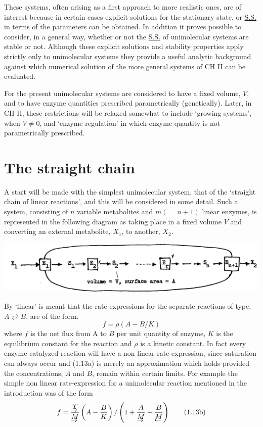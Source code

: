 These systems, often arising as a first approach to more realistic ones, are of interest because in certain cases explicit solutions for the stationary state, or \underline{S.S.} in terms of the parameters can be obtained. In addition it proves possible to consider, in a general way, whether or not the \underline{S.S.} of unimolecular systems are stable or not. Although these explicit solutions and stability properties apply strictly only to unimolecular systems they provide a useful analytic background against which numerical solution of the more general systems of CH II can be evaluated.

For the present unimolecular systems are considered to have a fixed volume, $V$, and to have enzyme quantities prescribed parametrically (genetically). Later, in CH II, these restrictions will be relaxed somewhat to include `growing systems', when $\dot{V} \neq 0$, and `enzyme regulation' in which enzyme quantity is not parametrically prescribed.

\section{The straight chain}

A start will be made with the simplest unimolecular system, that of the `straight chain of linear reactions', and this will be considered in some detail. Such a system, consisting of $n$ variable metabolites and $m(=n+1)$ linear enzymes, is represented in the following diagram as taking place in a fixed volume $V$ and converting an external metabolite, $X_1$, to another, $X_2$.

\begin{center}
\includegraphics[max width=\textwidth]{figure1_chain}
\end{center}

By `linear' is meant that the rate-expressions for the separate reactions of type, $A \rightleftarrows B$, are of the form.
%
\begin{equation}
f = \rho(A-B / K) \tag{1.13a}
\label{eqn:113a}
\end{equation}
%
where $f$ is the net flux from A to $B$ per unit quantity of enzyme, $K$ is the equilibrium constant for the reaction and $\rho$ is a kinetic constant. In fact every enzyme catalyzed reaction will have a non-linear rate expression, since saturation can always occur and (1.13a) is merely an approximation which holds provided the concentrations, $A$ and $B$, remain within certain limits. For example the simple non linear rate-expression for a unimolecular reaction mentioned in the introduction was of the form
%
\begin{equation}
f = \frac{\vecur{T}}{\vecur{M}}\left(A - \frac{B}{K}\right) /\left(1 + \frac{A}{\vecur{M}} + \frac{B}{\vecul{M}}\right) \tag{1.13b}
\label{eqn:113b}
\end{equation}
%

